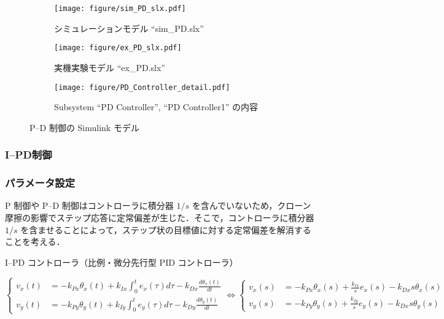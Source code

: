 \begin{figure}[H]
    \centering
    \begin{subfigure}{0.4\linewidth}
        \centering
        \texttt{[image: figure/sim\_PD\_slx.pdf]}
        \caption{シミュレーションモデル ``sim\_PD.slx''}
    \end{subfigure}
    
    \vspace{0.5cm}
    
    \begin{subfigure}{0.8\linewidth}
        \centering
        \texttt{[image: figure/ex\_PD\_slx.pdf]}
        \caption{実機実験モデル ``ex\_PD.slx''}
    \end{subfigure}
    
    \vspace{0.5cm}
    
    \begin{subfigure}{0.8\linewidth}
        \centering
        \texttt{[image: figure/PD\_Controller\_detail.pdf]}
        \caption{Subsystem ``PD Controller'', ``PD Controller1'' の内容}
    \end{subfigure}
    
    \caption{P--D 制御の Simulink モデル}
    \label{fig:pd_simulink_model}
\end{figure}

\subsubsection{I--PD制御}
\subsubsection{パラメータ設定}

P 制御や P--D 制御はコントローラに積分器 \(1/s\) を含んでいないため，クローン摩擦の影響でステップ応答に定常偏差が生じた．そこで，コントローラに積分器 \(1/s\) を含ませることによって，ステップ状の目標値に対する定常偏差を解消することを考える．

I--PD コントローラ（比例・微分先行型 PID コントローラ）

\begin{equation}
\left\{
\begin{aligned}
v_x(t) &= -k_{Px} \theta_x(t) + k_{Ix} \int_0^t e_x(\tau) d\tau - k_{Dx} \frac{d\theta_x(t)}{dt} \\
v_y(t) &= -k_{Py} \theta_y(t) + k_{Iy} \int_0^t e_y(\tau) d\tau - k_{Dy} \frac{d\theta_y(t)}{dt}
\end{aligned}
\right.
\Longleftrightarrow
\left\{
\begin{aligned}
v_x(s) &= -k_{Px} \theta_x(s) + \frac{k_{Ix}}{s} e_x(s) - k_{Dx}s \theta_x(s) \\
v_y(s) &= -k_{Py} \theta_y(s) + \frac{k_{Iy}}{s} e_y(s) - k_{Dx}s \theta_y(s)
\end{aligned}
\right.
\tag{5.12}
\end{equation}

